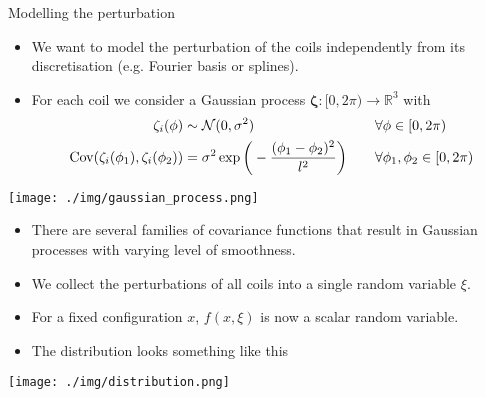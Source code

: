 \documentclass[aspectratio=1610, 10pt]{beamer}
\begin{document}
\begin{frame}{Modelling the perturbation}
    \begin{itemize}
        \item We want to model the perturbation of the coils independently from its discretisation (e.g. Fourier basis or splines).
        \item For each coil we consider a Gaussian process $\bm{\zeta}:[0, 2\pi) \to \mathbb{R}^3$ with
            \begin{equation}
                \begin{aligned}
                    \zeta_i(\phi) &\sim \Nc(0, \sigma^2) &\quad & \forall \phi\in[0,2\pi) \\
                    \mathrm{Cov}(\zeta_i(\phi_1), \zeta_i(\phi_2))&=\sigma^2 \exp\bigg(-\frac{(\phi_1-\phi_2)^2}{l^2} \bigg)&&\forall \phi_1, \phi_2\in[0,2\pi)
                \end{aligned}
            \end{equation}
    \end{itemize} 
    \begin{center}
        \texttt{[image: ./img/gaussian\_process.png]}
    \end{center}
    \begin{itemize}
        \item There are several families of covariance functions that result in Gaussian processes with varying level of smoothness.
    \end{itemize}
\end{frame}
\begin{frame}
    \begin{itemize}
        \item We collect the perturbations of all coils into a single random variable $\xi$.   
        \item For a fixed configuration $x$, $f(x, \xi)$ is now a scalar random variable.
        \item The distribution looks something like this
    \end{itemize}
    \begin{center}
        \texttt{[image: ./img/distribution.png]}
    \end{center}
\end{frame}
\end{document}
